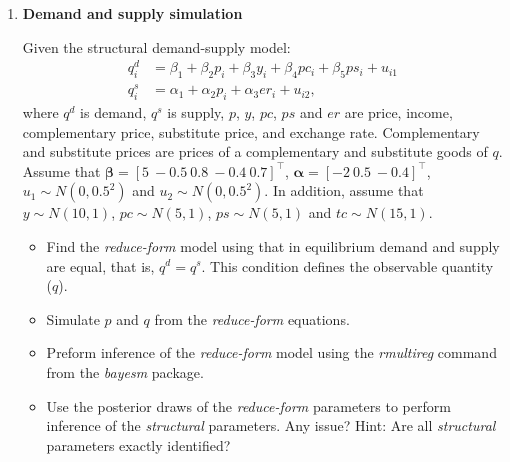 \begin{enumerate}[leftmargin=*]
\begin{tcolorbox}[enhanced,width=4.67in,center upper,
	fontupper=\large\bfseries,drop shadow southwest,sharp corners]
	\textit{R code. The effect of institutions on per capita GDP}
	\begin{VF}
		\begin{lstlisting}[language=R]
rm(list = ls())
set.seed(010101)
DataInst <- read.csv("https://raw.githubusercontent.com/besmarter/BSTApp/refs/heads/master/DataApp/4Institutions.csv", sep = ",", header = TRUE, quote = "")
attach(DataInst)
Y <- cbind(logpcGDP95, PAER)
X <- cbind(1, logMort, Africa, Asia, Other)
M <- dim(Y)[2]
K <- dim(X)[2]
# Hyperparameters
B0 <- matrix(0, K, M)
c0 <- 100
V0 <- c0*diag(K)
Psi0 <- 5*diag(M)
a0 <- 5
S <- 10000 #Number of posterior draws
betadraw = matrix(double(S*K*M), ncol=K*M)
Sigmadraw = matrix(double(S*M*M), ncol=M*M)
pb <- winProgressBar(title = "progress bar", min = 0, max = S, width = 300)
for (s in 1:S) {
	Results <- bayesm::rmultireg(Y, X, Bbar = B0, A = solve(V0), nu = a0, V = Psi0)
	betadraw[s,] <- Results$B
	Sigmadraw[s,] <- Results$Sigma
	setWinProgressBar(pb, s, title=paste( round(s/S*100, 0), "% done"))
}
close(pb)
summary(coda::mcmc(betadraw))
summary(coda::mcmc(Sigmadraw))
\end{lstlisting}
	\end{VF}
\end{tcolorbox} 
 
	\item \textbf{Demand and supply simulation}

Given the structural demand-supply model:
\begin{align*}
	q_i^d&=\beta_1+\beta_2p_i+\beta_3y_i+\beta_4pc_i+\beta_5ps_i+u_{i1}\\
	q_i^s&=\alpha_1+\alpha_2p_i+\alpha_3er_i+u_{i2},
\end{align*}
where $q^d$ is demand, $q^s$ is supply, $p$, $y$, $pc$, $ps$ and $er$ are price, income, complementary price, substitute price, and exchange rate. Complementary and substitute prices are prices of a complementary and substitute goods of $q$. Assume that $\bm{\beta}=\left[5 \ -0.5 \ 0.8 \ -0.4 \ 0.7\right]^{\top}$, $\bm{\alpha}=\left[-2 \ 0.5 \ -0.4\right]^{\top}$, $u_1\sim N(0, 0.5^2)$ and $u_2\sim N(0, 0.5^2)$. In addition, assume that $y\sim N(10,1)$, $pc\sim N(5,1)$, $ps\sim N(5,1)$ and $tc\sim N(15,1)$.
\begin{itemize}
	\item Find the \textit{reduce-form} model using that in equilibrium demand and supply are equal, that is, $q^d=q^s$. This condition defines the observable quantity ($q$).
	\item Simulate $p$ and $q$ from the \textit{reduce-form} equations.
	\item Preform inference of the \textit{reduce-form} model using the \textit{rmultireg} command from the \textit{bayesm} package.
	\item Use the posterior draws of the \textit{reduce-form} parameters to perform inference of the \textit{structural} parameters. Any issue? Hint: Are all \textit{structural} parameters exactly identified?   
\end{itemize}


\end{enumerate}
